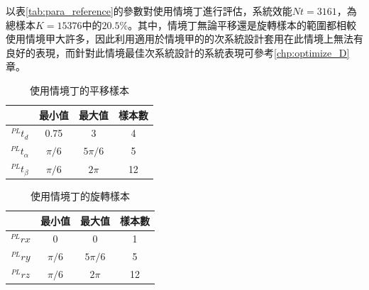 以表\ref{tab:para_reference}的參數對使用情境丁進行評估，系統效能$Nt=3161$，為總樣本$K=15376$中的$20.5\%$。其中，情境丁無論平移還是旋轉樣本的範圍都相較使用情境甲大許多，因此利用適用於情境甲的的次系統設計套用在此情境上無法有良好的表現，而針對此情境最佳次系統設計的系統表現可參考\ref{chp:optimize_D}章。

\begin{table}[htpb]
    \begin{center}
      \caption{使用情境丁的平移樣本}
      \label{tab:D_translate}
      \begin{tabular}{c|c|c|c} %
         & \textbf{最小值} & \textbf{最大值}&\textbf{樣本數}\\
        \hline
        $^{PL}t_d$ & 0.75 &3&4\\
        $^{PL}t_{\alpha}$ & $\pi/6$ & $5\pi/6$ & 5\\
        $^{PL}t_{\beta}$ & $\pi/6$ & $2\pi$ &12\\
      \end{tabular}
    \end{center}
  \end{table}

  \begin{table}[htpb]
    \begin{center}
      \caption{使用情境丁的旋轉樣本}
      \label{tab:D_rotate}
      \begin{tabular}{c|c|c|c} %
         & \textbf{最小值} & \textbf{最大值}&\textbf{樣本數}\\
        \hline
        $^{PL}rx$ & 0 &0&1\\
        $^{PL}ry$ & $\pi/6$ & $5\pi/6$ & 5\\
        $^{PL}rz$ & $\pi/6$ & $2\pi$ &12\\
      \end{tabular}
    \end{center}
  \end{table}


